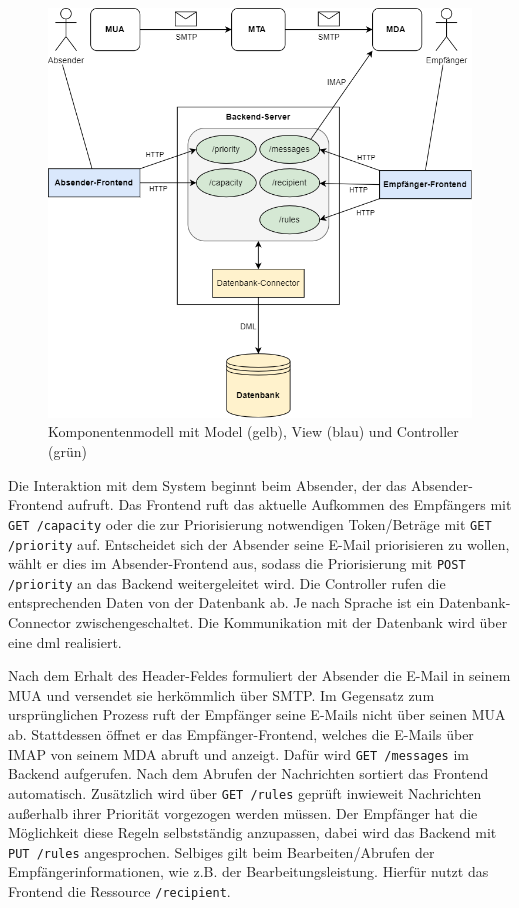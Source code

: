 \begin{figure}[!ht]
    \centering
 	\includegraphics[width=1\textwidth]{Figures/Komponentenmodell.png}
	\caption[Komponentenmodell mit Model, View und Controller]{Komponentenmodell mit Model (gelb), View (blau) und Controller (grün)}
	\label{fig:Komponentenmodell}
\end{figure}

\noindent Die Interaktion mit dem System beginnt beim Absender, der das Absender-Frontend aufruft. Das Frontend ruft das aktuelle Aufkommen des Empfängers mit \texttt{GET /capacity} oder die zur Priorisierung notwendigen Token/Beträge mit \texttt{GET /priority} auf. Entscheidet sich der Absender seine E-Mail priorisieren zu wollen, wählt er dies im Absender-Frontend aus, sodass die Priorisierung mit \texttt{POST /priority} an das Backend weitergeleitet wird. Die Controller rufen die entsprechenden Daten von der Datenbank ab. Je nach Sprache ist ein Datenbank-Connector zwischengeschaltet. Die Kommunikation mit der Datenbank wird über eine \acrfull{dml} realisiert.

Nach dem Erhalt des Header-Feldes formuliert der Absender die E-Mail in seinem MUA und versendet sie herkömmlich über SMTP. Im Gegensatz zum ursprünglichen Prozess ruft der Empfänger seine E-Mails nicht über seinen MUA ab. Stattdessen öffnet er das Empfänger-Frontend, welches die E-Mails über IMAP von seinem MDA abruft und anzeigt. Dafür wird \texttt{GET /messages} im Backend aufgerufen. Nach dem Abrufen der Nachrichten sortiert das Frontend automatisch. Zusätzlich wird über \texttt{GET /rules} geprüft inwieweit Nachrichten außerhalb ihrer Priorität vorgezogen werden müssen. Der Empfänger hat die Möglichkeit diese Regeln selbstständig anzupassen, dabei wird das Backend mit \texttt{PUT /rules} angesprochen. Selbiges gilt beim Bearbeiten/Abrufen der Empfängerinformationen, wie z.B. der Bearbeitungsleistung. Hierfür nutzt das Frontend die Ressource \texttt{/recipient}.

